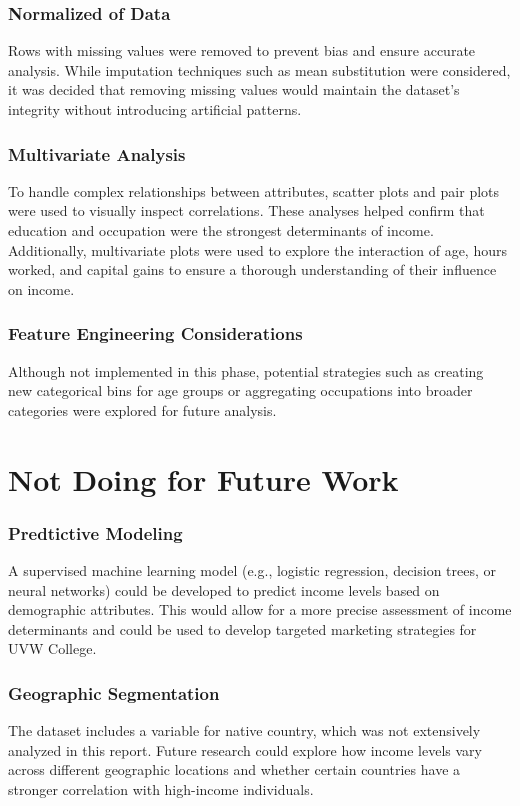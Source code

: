 \documentclass[journal,onecolumn]{IEEEtran}
\begin{document}
\subsubsection{Normalized of Data}Rows with missing values were removed to 
prevent bias and ensure accurate analysis. While imputation techniques 
such as mean substitution were considered, it was decided that removing 
missing values would maintain the dataset's integrity without introducing 
artificial patterns.
\subsubsection{Multivariate Analysis}To handle complex relationships 
between attributes, scatter plots and pair plots were used to visually 
inspect correlations. These analyses helped confirm that education and 
occupation were the strongest determinants of income. Additionally, multivariate
 plots were used to explore the interaction of age, hours worked, and capital 
 gains to ensure a thorough understanding of their influence on income.
\subsubsection{Feature Engineering Considerations}Although not implemented 
in this phase, potential strategies such as creating new categorical bins 
for age groups or aggregating occupations into broader categories were explored 
for future analysis.

\section{Not Doing for Future Work}
\subsubsection{Predtictive Modeling}A supervised machine learning model 
(e.g., logistic regression, decision trees, or neural networks) could be 
developed to predict income levels based on demographic attributes. This 
would allow for a more precise assessment of income determinants and 
could be used to develop targeted marketing strategies for UVW College.
\subsubsection{Geographic Segmentation}The dataset includes a variable 
for native country, which was not extensively analyzed in this report. 
Future research could explore how income levels vary across different 
geographic locations and whether certain countries have a stronger 
correlation with high-income individuals.
\end{document}
